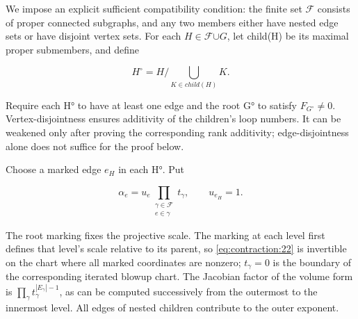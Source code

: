 \documentclass[11pt,a4paper,oneside]{article}
\theoremstyle{plain}
\theoremstyle{definition}
\theoremstyle{remark}
\numberwithin{equation}{section}
\begin{document}
We impose an explicit sufficient compatibility condition: the finite set \(\mathscr F\) consists of proper connected subgraphs, and any two members either have nested edge sets or have disjoint vertex sets. For each \(H\in \)\(\mathscr F\)\(\cup {G}\), let child(H) be its maximal proper submembers, and define

\begin{equation}
H^\circ=H/\bigcup_{K\in child(H)}K.      \label{eq:contraction:21}
\end{equation}

Require each H° to have at least one edge and the root G° to satisfy \(F_{G^\circ}\ne 0\). Vertex-disjointness ensures additivity of the children's loop numbers. It can be weakened only after proving the corresponding rank additivity; edge-disjointness alone does not suffice for the proof below.

Choose a marked edge \(e_H\) in each H°. Put

\begin{equation}
\alpha_e=u_e\prod_{\substack{\gamma\in\mathscr F\\e\in\gamma}}t_\gamma,
                  \qquad u_{e_H}=1.                             \label{eq:contraction:22}
\end{equation}

The root marking fixes the projective scale. The marking at each level first defines that level's scale relative to its parent, so \eqref{eq:contraction:22} is invertible on the chart where all marked coordinates are nonzero; \(t_\gamma =0\) is the boundary of the corresponding iterated blowup chart. The Jacobian factor of the volume form is \(\prod _\gamma  t_\gamma ^{|E_\gamma |- 1}\), as can be computed successively from the outermost to the innermost level. All edges of nested children contribute to the outer exponent.
\end{document}
